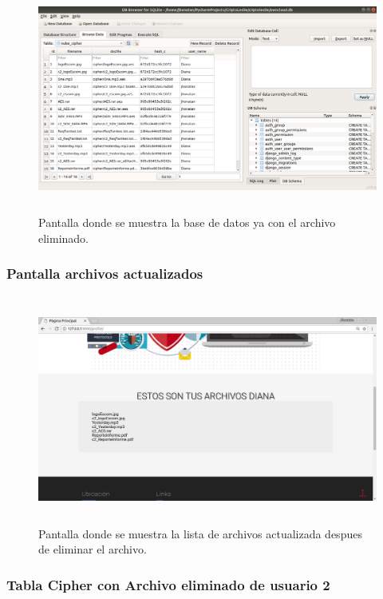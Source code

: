 			\begin{figure}[H]
			\centering
			\includegraphics[width=14cm, height=7.5cm]{./images/Implementacion/TablaCipherArchivoEliminado.png}
			\caption{Pantalla donde se muestra la base de datos ya con el archivo eliminado.}
			\label{fig:6-1-38} 
			\end{figure}

\subsubsection{Pantalla archivos actualizados}

			\begin{figure}[H]
			\centering
			\includegraphics[width=14cm, height=7.5cm]{./images/Implementacion/ArchivoEliminado.png}
			\caption{Pantalla donde se muestra la lista de archivos actualizada despues de eliminar el archivo.}
			\label{fig:6-1-39} 
			\end{figure}

\subsubsection{Tabla Cipher con Archivo eliminado de usuario 2}

